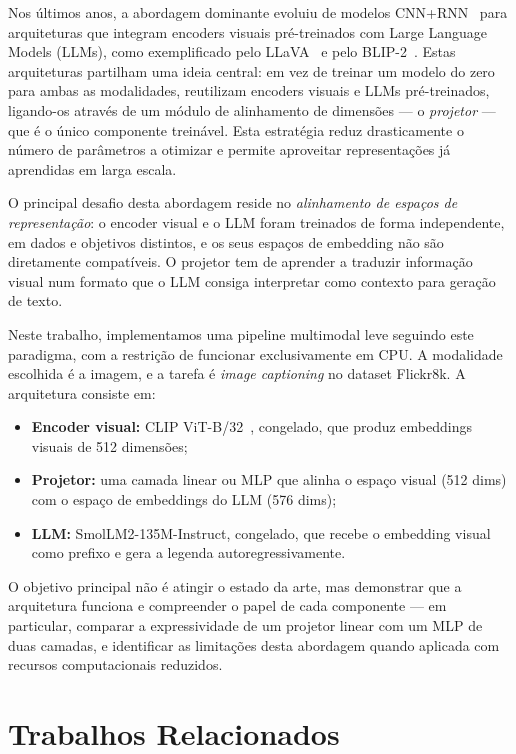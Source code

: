 \documentclass[conference]{IEEEtran}
\begin{document}
Nos últimos anos, a abordagem dominante evoluiu de modelos CNN+RNN~\cite{b4} para arquiteturas que integram encoders visuais pré-treinados com Large Language Models (LLMs), como exemplificado pelo LLaVA~\cite{b1} e pelo BLIP-2~\cite{b5}. Estas arquiteturas partilham uma ideia central: em vez de treinar um modelo do zero para ambas as modalidades, reutilizam encoders visuais e LLMs pré-treinados, ligando-os através de um módulo de alinhamento de dimensões --- o \textit{projetor} --- que é o único componente treinável. Esta estratégia reduz drasticamente o número de parâmetros a otimizar e permite aproveitar representações já aprendidas em larga escala.

O principal desafio desta abordagem reside no \textit{alinhamento de espaços de representação}: o encoder visual e o LLM foram treinados de forma independente, em dados e objetivos distintos, e os seus espaços de embedding não são diretamente compatíveis. O projetor tem de aprender a traduzir informação visual num formato que o LLM consiga interpretar como contexto para geração de texto.

Neste trabalho, implementamos uma pipeline multimodal leve seguindo este paradigma, com a restrição de funcionar exclusivamente em CPU. A modalidade escolhida é a imagem, e a tarefa é \textit{image captioning} no dataset Flickr8k. A arquitetura consiste em:
\begin{itemize}
    \item \textbf{Encoder visual:} CLIP ViT-B/32~\cite{b3}, congelado, que produz embeddings visuais de 512 dimensões;
    \item \textbf{Projetor:} uma camada linear ou MLP que alinha o espaço visual (512 dims) com o espaço de embeddings do LLM (576 dims);
    \item \textbf{LLM:} SmolLM2-135M-Instruct, congelado, que recebe o embedding visual como prefixo e gera a legenda autoregressivamente.
\end{itemize}

O objetivo principal não é atingir o estado da arte, mas demonstrar que a arquitetura funciona e compreender o papel de cada componente --- em particular, comparar a expressividade de um projetor linear com um MLP de duas camadas, e identificar as limitações desta abordagem quando aplicada com recursos computacionais reduzidos.


\section{Trabalhos Relacionados}
\end{document}

